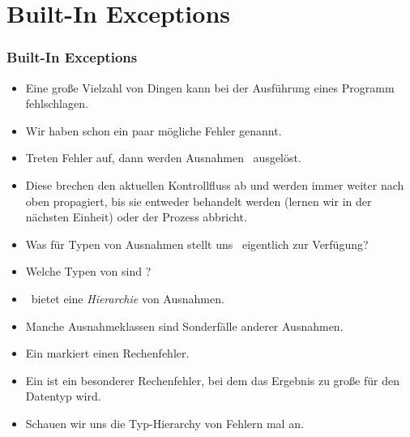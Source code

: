 \documentclass[aspectratio=169,mathserif,notheorems]{beamer}%
\begin{document}
\section{Built-In Exceptions}%
%
\begin{frame}%
\frametitle{Built-In Exceptions}%
\begin{itemize}%
\item Eine große Vielzahl von Dingen kann bei der Ausführung eines Programm fehlschlagen.%
%
\item<2-> Wir haben schon ein paar mögliche Fehler genannt.%
%
\item<3-> Treten Fehler auf, dann werden Ausnahmen~ ausgelöst.%
%
\item<4-> Diese brechen den aktuellen Kontrollfluss ab und werden immer weiter nach oben propagiert, bis sie entweder behandelt werden (lernen wir in der nächsten Einheit) oder der Prozess abbricht.%
\item<5-> Was für Typen von Ausnahmen stellt uns \python\ eigentlich zur Verfügung?%
%
\item<6-> Welche Typen von  sind ?%
%
\item<7-> \python\ bietet eine \emph{Hierarchie} von Ausnahmen.%
%
\item<8-> Manche Ausnahmeklassen sind Sonderfälle anderer Ausnahmen.%
%
\item<9-> Ein  markiert einen Rechenfehler.%
%
\item<10-> Ein  ist ein besonderer Rechenfehler, bei dem das Ergebnis zu große für den Datentyp wird.%
%
\item<11-> Schauen wir uns die Typ-Hierarchy von Fehlern mal an\cite{PSF:P3D:TPSL:BIE}.%
\end{itemize}%
\end{frame}%
%
\end{document}
